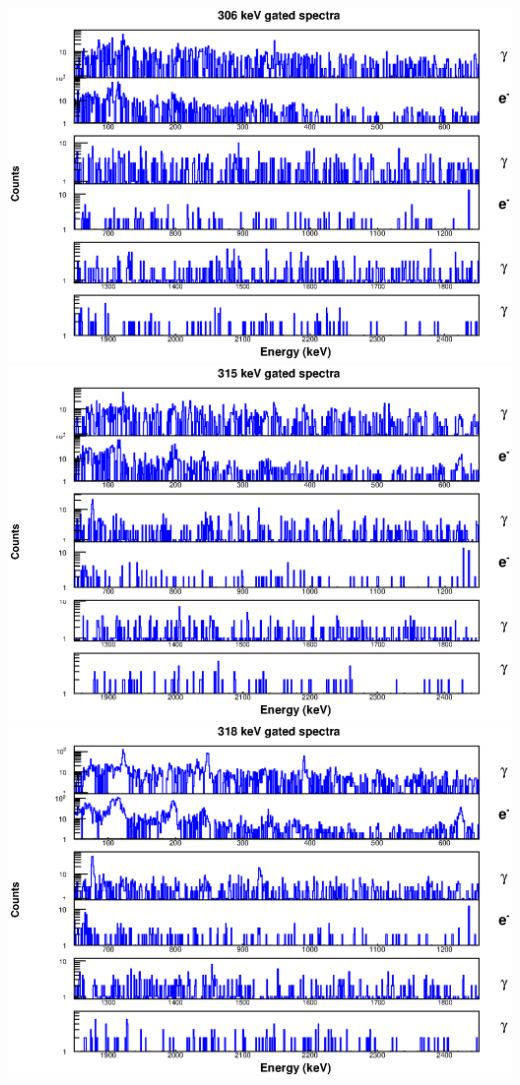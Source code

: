 \begin{landscape}
\includegraphics[scale=1.1]{154Gd_Appendix/306_combined.eps}
\includegraphics[scale=1.1]{154Gd_Appendix/315_combined.eps}
\includegraphics[scale=1.1]{154Gd_Appendix/318_combined.eps}

\end{landscape}
